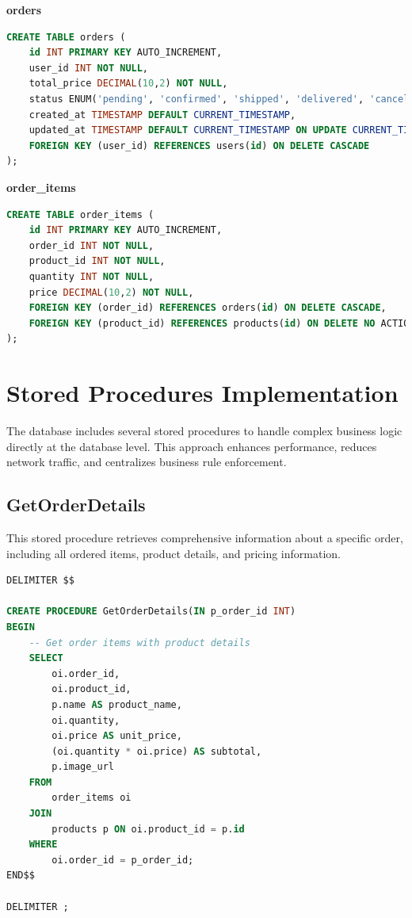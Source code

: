 \documentclass[14pt,a4paper]{article}
\begin{document}
\begin{mdframed}[backgroundcolor=blue!5, linecolor=blue!40, linewidth=1pt]
	\textbf{orders}
	\begin{lstlisting}[language=SQL, numbers=none]
CREATE TABLE orders (
    id INT PRIMARY KEY AUTO_INCREMENT,
    user_id INT NOT NULL,
    total_price DECIMAL(10,2) NOT NULL,
    status ENUM('pending', 'confirmed', 'shipped', 'delivered', 'cancelled') DEFAULT 'pending',
    created_at TIMESTAMP DEFAULT CURRENT_TIMESTAMP,
    updated_at TIMESTAMP DEFAULT CURRENT_TIMESTAMP ON UPDATE CURRENT_TIMESTAMP,
    FOREIGN KEY (user_id) REFERENCES users(id) ON DELETE CASCADE
);
\end{lstlisting}
\end{mdframed}

\begin{mdframed}[backgroundcolor=blue!5, linecolor=blue!40, linewidth=1pt]
	\textbf{order\_items}
	\begin{lstlisting}[language=SQL, numbers=none]
CREATE TABLE order_items (
    id INT PRIMARY KEY AUTO_INCREMENT,
    order_id INT NOT NULL,
    product_id INT NOT NULL,
    quantity INT NOT NULL,
    price DECIMAL(10,2) NOT NULL,
    FOREIGN KEY (order_id) REFERENCES orders(id) ON DELETE CASCADE,
    FOREIGN KEY (product_id) REFERENCES products(id) ON DELETE NO ACTION
);
\end{lstlisting}
\end{mdframed}

\section{Stored Procedures Implementation}

The database includes several stored procedures to handle complex business logic directly at the database level. This approach enhances performance, reduces network traffic, and centralizes business rule enforcement.

\subsection{GetOrderDetails}

This stored procedure retrieves comprehensive information about a specific order, including all ordered items, product details, and pricing information.

\begin{lstlisting}[language=SQL, caption={GetOrderDetails Stored Procedure}, label={lst:get-order-details}]
DELIMITER $$

CREATE PROCEDURE GetOrderDetails(IN p_order_id INT)
BEGIN
    -- Get order items with product details
    SELECT 
        oi.order_id,
        oi.product_id,
        p.name AS product_name,
        oi.quantity,
        oi.price AS unit_price,
        (oi.quantity * oi.price) AS subtotal,
        p.image_url
    FROM 
        order_items oi
    JOIN 
        products p ON oi.product_id = p.id
    WHERE 
        oi.order_id = p_order_id;
END$$

DELIMITER ;
\end{lstlisting}
\end{document}
